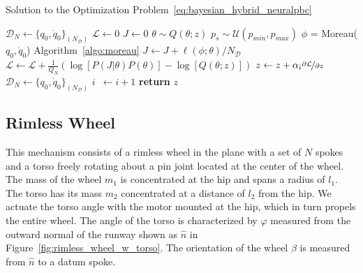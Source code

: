 \begin{algorithm}
    \caption{Solution to the Optimization Problem~\eqref{eq:bayesian_hybrid_neuralpbc}}
    \label{algo:bayes_neuralpbc}
    \small
    \begin{algorithmic}[1]
        \algrenewcommand\algorithmicindent{0em} %
        \State $\mathcal{D}_N \gets \{q_0, \dot{q}_0\}_{(N_{\mathcal{D}})}$   
        \algrenewcommand\algorithmicindent{1.1em} %
        \State $\mathcal{L} \gets 0$ 
         
        \State $J \gets 0$ 
        \State $\theta \sim Q(\theta; z)$ 
            \State $p_s \sim \mathcal{U}(p_{min}, p_{max})$
            \State $\phi$ = Moreau($q_0, \dot{q}_0$) \Comment Algorithm~\eqref{algo:moreau}
            \State $J \gets J + \ell(\phi; \theta)/N_{\mathcal{D}}$ 
          \EndFor
        \State $\mathcal{L} \gets \mathcal{L} + \frac{1}{Q_N} \left(\log[P(J | \theta) P(\theta)] - \log[Q(\theta;z)]\right)$
        \EndFor
        \State $z \gets z + \alpha_i \nicefrac{\partial \mathcal{L}}{\partial z}$
        \State $\mathcal{D}_N \gets \{q_0, \dot{q}_0\}_{(N_{\mathcal{D}})}$
        \State $i \;\:\gets i + 1$
        \EndWhile
        \State \textbf{return} $z$
    \end{algorithmic}
\end{algorithm}


\subsection{Rimless Wheel}
\label{sssec:model}

This mechanism consists of a rimless wheel in the plane with a set of $N$ spokes
and a torso freely rotating about a pin joint located at the center of the
wheel.
% 
The mass of the wheel $m_1$ is concentrated at the hip and spans a radius of
$l_1$.
%
The torso has its mass $m_2$ concentrated at a distance of $l_2$ from the hip. 
%
We actuate the torso angle with the motor mounted at the hip, which in turn
propels the entire wheel. 
%
The angle of the torso is characterized by $\varphi$ measured from the outward
normal of the runway shown as $\hat{n}$ in Figure~\ref{fig:rimless_wheel_w_torso}.  
%
The orientation of the wheel $\beta$ is measured from $\hat{n}$ to a datum spoke.
%

